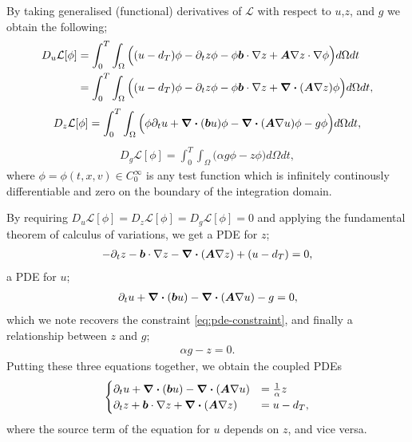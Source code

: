 \documentclass{article}  %
\begin{document}
By taking generalised (functional) derivatives of $\mathcal{L}$ with respect to $u$,$z$, and $g$ we obtain the following;
%
\begin{align} 
    D_u \mathcal{L}[\phi] &= \int_{0}^{T} \int_{\Omega} \Big((u-d_T)\phi - \partial_t z \phi - \phi \boldsymbol{b}\cdot\nabla z + \boldsymbol{A} \nabla z \cdot \nabla \phi \Big) d\Omega dt\\
    &= \int_{0}^{T} \int_{\Omega} \Big((u-d_T)\phi - \partial_t z \phi - \phi \boldsymbol{b}\cdot\nabla z + \div{(\boldsymbol{A} \nabla z)} \phi \Big) d\Omega dt,
\end{align}
%
\begin{align} 
    D_z\mathcal{L}[\phi] = \int_{0}^{T} \int_{\Omega} \Big( \phi \partial_t u + \div{(\boldsymbol{b}u)} \phi - \div{(\boldsymbol{A} \nabla u)} \phi - g \phi \Big) d\Omega dt,
\end{align}
%
\begin{align} 
    D_g\mathcal{L}[\phi] = \int_{0}^{T} \int_{\Omega} \Big( \alpha g \phi - z \phi \Big) d\Omega dt,
\end{align}
%
where $\phi = \phi(t,x,v) \in C^{\infty}_{0}$ is any test function which is infinitely continously differentiable and zero on the boundary of the integration domain.

By requiring $D_u \mathcal{L}[\phi]=D_z \mathcal{L}[\phi]=D_g \mathcal{L}[\phi]=0$ and applying the fundamental theorem of calculus of variations, we get a PDE for $z$;
%
\begin{align} 
    - \partial_t z - \boldsymbol{b} \cdot \nabla z - \div{(\boldsymbol{A} \nabla z)} + (u - d_T) = 0,
\end{align}
% 
a PDE for $u$;
%
\begin{align} 
    \partial_t u + \div{(\boldsymbol{b}u)} - \div{(\boldsymbol{A} \nabla u)} - g = 0,
\end{align}
%
which we note recovers the constraint \autoref{eq:pde-constraint}, and finally a relationship between $z$ and $g$;
%
\begin{align}
    \alpha g - z = 0. 
\end{align}
%
Putting these three equations together, we obtain the coupled PDEs 
%
\begin{align} 
    \label{eq:coupled-pdes}
    \begin{cases} 
        \partial_t u + \div{(\boldsymbol{b}u)} - \div{(\boldsymbol{A} \nabla u)} &= \frac{1}{\alpha} z\\
        \partial_t z + \boldsymbol{b} \cdot \nabla z + \div{(\boldsymbol{A} \nabla z)} &= u - d_T,
    \end{cases}
\end{align}
%
where the source term of the equation for $u$ depends on $z$, and vice versa.
\end{document}
